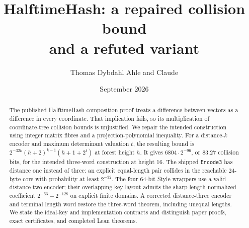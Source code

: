 \usepackage{lmodern,amsmath,amssymb,amsthm,mathtools,booktabs,array,longtable}
\usepackage[margin=24mm,headheight=14pt]{geometry}
\usepackage{microtype,xcolor,url,fancyhdr}
\usepackage[colorlinks=true,allcolors=blue!40!black,breaklinks=true]{hyperref}
\pagestyle{fancy}\fancyhf{}\fancyfoot[C]{\thepage}
\renewcommand{\headrulewidth}{0.3pt}
\newtheorem{theorem}{Theorem}[section]\newtheorem{lemma}[theorem]{Lemma}
\newtheorem{proposition}[theorem]{Proposition}\newtheorem{corollary}[theorem]{Corollary}
\newcommand{\Z}{\mathbb Z}\newcommand{\F}{\mathbb F}
\newcommand{\Prb}{\mathop{\rm Pr}}\newcommand{\E}{\mathbb E}
\newcommand{\eps}{\varepsilon}\newcommand{\NH}{\operatorname{NH}}
\newcommand{\val}{\nu_2}\newcommand{\xor}{\mathbin\oplus}
\newcommand{\ceil}[1]{\left\lceil#1\right\rceil}\newcommand{\floor}[1]{\left\lfloor#1\right\rfloor}
\setlength{\emergencystretch}{3em}\setlength{\parskip}{2pt}
\title{HalftimeHash: a repaired collision bound\\and a refuted variant}
\author{Thomas Dybdahl Ahle and Claude}\date{September 2026}

\maketitle
\begin{abstract}
The published HalftimeHash composition proof treats a difference between vectors as a difference in every coordinate. That implication fails, so its multiplication of coordinate-tree collision bounds is unjustified. We repair the intended construction using integer matrix fibres and a projection-polynomial inequality. For a distance-$k$ encoder and maximum determinant valuation $t$, the resulting bound is $2^{-32k}(h+2)^{k-1}(h+1+2^t)$ at forest height $h$. It gives $6804\cdot2^{-96}$, or $83.27$ collision bits, for the intended three-word construction at height 16. The shipped \texttt{Encode3} has distance one instead of three: an explicit equal-length pair collides in the reachable 24-byte core with probability at least $2^{-32}$. The four 64-bit Style wrappers use a valid distance-two encoder; their overlapping key layout admits the sharp length-normalized coefficient $2^{-63}-2^{-128}$ on explicit finite domains. A corrected distance-three encoder and terminal length word restore the three-word theorem, including unequal lengths. We state the ideal-key and implementation contracts and distinguish paper proofs, exact certificates, and completed Lean theorems.
\end{abstract}

